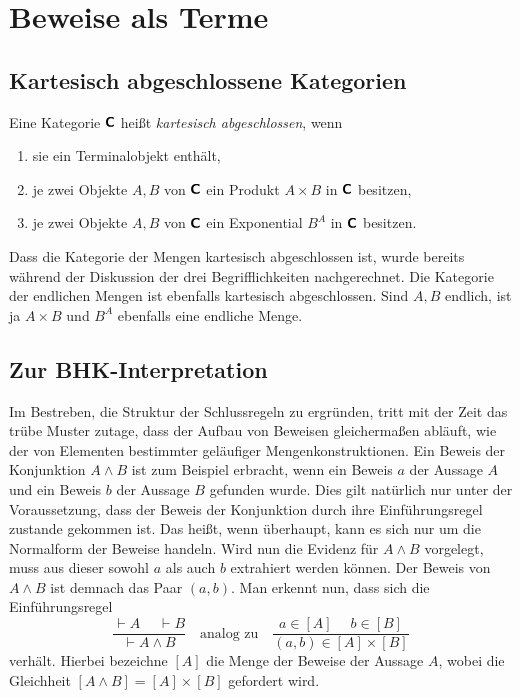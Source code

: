 \newpage
\section{Beweise als Terme}

\subsection{Kartesisch abgeschlossene Kategorien}

\begin{Definition}\newlinefirst
Eine Kategorie $\textsf{\textbf{C}}$ heißt \emph{kartesisch abgeschlossen},
wenn
\begin{enumerate}[nosep]
\item sie ein Terminalobjekt enthält,
\item je zwei Objekte $A,B$ von $\textsf{\textbf{C}}$ ein Produkt
  $A\times B$ in $\textsf{\textbf{C}}$ besitzen,
\item je zwei Objekte $A,B$ von $\textsf{\textbf{C}}$ ein Exponential
  $B^A$ in $\textsf{\textbf{C}}$ besitzen.
\end{enumerate}
\end{Definition}

\noindent
Dass die Kategorie der Mengen kartesisch abgeschlossen ist, wurde
bereits während der Diskussion der drei Begrifflichkeiten
nachgerechnet. Die Kategorie der endlichen Mengen ist ebenfalls
kartesisch abgeschlossen. Sind $A,B$ endlich, ist ja $A\times B$
und $B^A$ ebenfalls eine endliche Menge.

\subsection{Zur BHK-Interpretation}

Im Bestreben, die Struktur der Schlussregeln zu ergründen, tritt
mit der Zeit das trübe Muster zutage, dass der Aufbau von Beweisen
gleichermaßen abläuft, wie der von Elementen bestimmter geläufiger
Mengenkonstruktionen. Ein Beweis der Konjunktion $A\land B$ ist
zum Beispiel erbracht, wenn ein Beweis $a$ der Aussage $A$ und
ein Beweis $b$ der Aussage $B$ gefunden wurde. Dies gilt natürlich
nur unter der Voraussetzung, dass der Beweis der Konjunktion durch ihre
Einführungsregel zustande gekommen ist. Das heißt, wenn überhaupt,
kann es sich nur um die Normalform der Beweise handeln. Wird nun die
Evidenz für $A\land B$ vorgelegt, muss aus dieser sowohl $a$ als auch
$b$ extrahiert werden können. Der Beweis von $A\land B$ ist demnach
das Paar $(a,b)$. Man erkennt nun, dass sich die Einführungsregel
\[\dfrac{\vdash A\quad\;\vdash B}{\vdash A\land B}\quad\text{analog zu}\quad
\dfrac{a\in [A]\quad\; b\in [B]}{(a,b)\in [A]\times [B]}\]
verhält. Hierbei bezeichne $[A]$ die Menge der Beweise der Aussage $A$,
wobei die Gleichheit $[A\land B] = [A]\times [B]$ gefordert wird.


